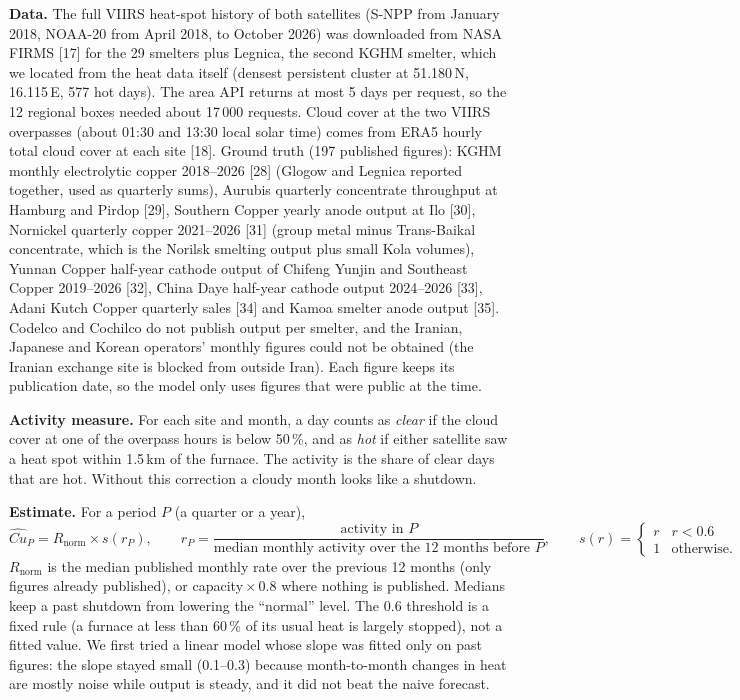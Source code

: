 \documentclass[10pt,a4paper]{article}
\begin{document}
\textbf{Data.} The full VIIRS heat-spot history of both satellites (S-NPP from January 2018, NOAA-20 from April 2018, to October 2026) was downloaded from NASA FIRMS [17] for the 29 smelters plus Legnica, the second KGHM smelter, which we located from the heat data itself (densest persistent cluster at 51.180\,N, 16.115\,E, 577 hot days). The area API returns at most 5 days per request, so the 12 regional boxes needed about 17\,000 requests. Cloud cover at the two VIIRS overpasses (about 01:30 and 13:30 local solar time) comes from ERA5 hourly total cloud cover at each site [18]. Ground truth (197 published figures): KGHM monthly electrolytic copper 2018--2026 [28] (Glogow and Legnica reported together, used as quarterly sums), Aurubis quarterly concentrate throughput at Hamburg and Pirdop [29], Southern Copper yearly anode output at Ilo [30], Nornickel quarterly copper 2021--2026 [31] (group metal minus Trans-Baikal concentrate, which is the Norilsk smelting output plus small Kola volumes), Yunnan Copper half-year cathode output of Chifeng Yunjin and Southeast Copper 2019--2026 [32], China Daye half-year cathode output 2024--2026 [33], Adani Kutch Copper quarterly sales [34] and Kamoa smelter anode output [35]. Codelco and Cochilco do not publish output per smelter, and the Iranian, Japanese and Korean operators' monthly figures could not be obtained (the Iranian exchange site is blocked from outside Iran). Each figure keeps its publication date, so the model only uses figures that were public at the time.

\textbf{Activity measure.} For each site and month, a day counts as \emph{clear} if the cloud cover at one of the overpass hours is below 50\,\%, and as \emph{hot} if either satellite saw a heat spot within 1.5\,km of the furnace. The activity is the share of clear days that are hot. Without this correction a cloudy month looks like a shutdown.

\textbf{Estimate.} For a period $P$ (a quarter or a year),
\[
\widehat{Cu}_P = R_{\text{norm}}\times s(r_P),\qquad r_P=\frac{\text{activity in }P}{\text{median monthly activity over the 12 months before }P},\qquad s(r)=\begin{cases} r & r<0.6\\ 1 & \text{otherwise.}\end{cases}
\]
$R_{\text{norm}}$ is the median published monthly rate over the previous 12 months (only figures already published), or capacity\,$\times$\,0.8 where nothing is published. Medians keep a past shutdown from lowering the ``normal'' level. The 0.6 threshold is a fixed rule (a furnace at less than 60\,\% of its usual heat is largely stopped), not a fitted value. We first tried a linear model whose slope was fitted only on past figures: the slope stayed small (0.1--0.3) because month-to-month changes in heat are mostly noise while output is steady, and it did not beat the naive forecast.
\end{document}

